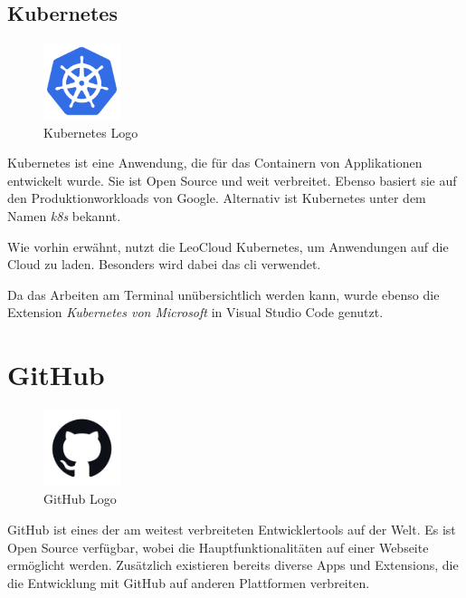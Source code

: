 \subsection{Kubernetes}
\begin{figure}
  \begin{center}
    \includegraphics[width=0.2\textwidth]{pics/logos/k8s.png}
   \caption{Kubernetes Logo}
  \end{center}
\end{figure}
Kubernetes ist eine Anwendung, die für das Containern von Applikationen entwickelt wurde. 
Sie ist Open Source und weit verbreitet. 
Ebenso basiert sie auf den Produktionworkloads von Google.
Alternativ ist Kubernetes unter dem Namen \emph{k8s} bekannt.
\cite{k8sAbout}

Wie vorhin erwähnt, nutzt die LeoCloud Kubernetes, um Anwendungen auf die Cloud zu laden. 
Besonders wird dabei das \gls{cli} verwendet. 

Da das Arbeiten am Terminal unübersichtlich werden kann, wurde ebenso die Extension \emph{Kubernetes von Microsoft} in Visual Studio Code genutzt.

\cite{k8sAboutExtension}

\section{GitHub}
\begin{figure}
  \begin{center}
      \includegraphics[width=0.2\textwidth]{pics/logos/github.png}
      \caption{GitHub Logo}
  \end{center}
\end{figure}
GitHub ist eines der am weitest verbreiteten Entwicklertools auf der Welt. 
Es ist Open Source verfügbar, wobei die Hauptfunktionalitäten auf einer Webseite ermöglicht werden. 
Zusätzlich existieren bereits diverse Apps und Extensions, die die Entwicklung mit GitHub auf anderen Plattformen verbreiten.
\cite{githubAbout}

